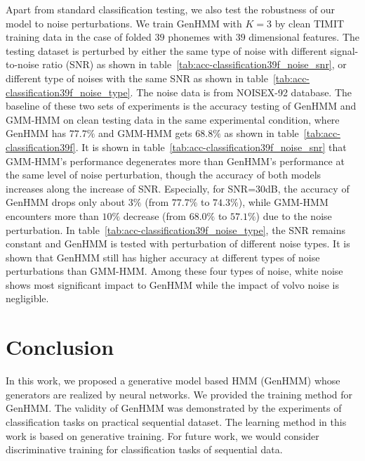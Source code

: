 \documentclass[letterpaper]{article} %
\begin{document}
Apart from standard classification testing, we also test the robustness of our model to noise perturbations. We train GenHMM with $K=3$ by clean TIMIT training data in the case of folded $39$ phonemes with $39$ dimensional features. The testing dataset is perturbed by either the same type of noise with different signal-to-noise ratio (SNR) as shown in table~\ref{tab:acc-classification39f_noise_snr}, or different type of noises with the same SNR as shown in table~\ref{tab:acc-classification39f_noise_type}. The noise data is from NOISEX-92 database. The baseline of these two sets of experiments is the accuracy testing of GenHMM and GMM-HMM on clean testing data in the same experimental condition, where GenHMM has $77.7\%$ and GMM-HMM gets $68.8\%$ as shown in table~\ref{tab:acc-classification39f}. It is shown in table~\ref{tab:acc-classification39f_noise_snr} that GMM-HMM's performance degenerates more than GenHMM's performance at the same level of noise perturbation, though the accuracy of both models increases along the increase of SNR. Especially, for SNR=$30$dB, the accuracy of GenHMM drops only about $3\%$ (from $77.7\%$ to $74.3\%$), while GMM-HMM encounters more than $10\%$ decrease (from $68.0\%$ to $57.1\%$) due to the noise perturbation. In table~\ref{tab:acc-classification39f_noise_type}, the SNR remains constant and GenHMM is tested with perturbation of different noise types. It is shown that GenHMM still has higher accuracy at different types of noise perturbations than GMM-HMM. Among these four types of noise, white noise shows most significant impact to GenHMM while the impact of volvo noise is negligible.


\section{Conclusion}
In this work, we proposed a generative model based HMM (GenHMM) whose generators are realized by neural networks. We provided the training method for GenHMM. The validity of GenHMM was demonstrated by the experiments of classification tasks on practical sequential dataset. The learning method in this work is based on generative training. For future work, we would consider discriminative training for classification tasks of sequential data.




\end{document}
